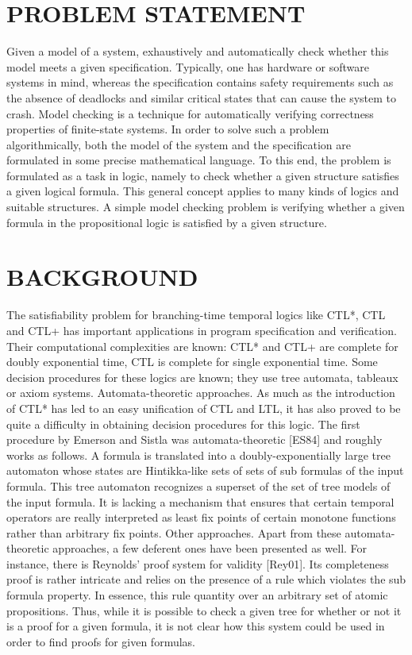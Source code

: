 \documentclass[12pt,letterpaper]{article}
\begin{document}
{\section{PROBLEM STATEMENT}
Given a model of a system, exhaustively and automatically check whether this model meets a given specification. Typically, one has hardware or software systems in mind, whereas the specification contains safety requirements such as the absence of deadlocks and similar critical states that can cause the system to crash. Model checking is a technique for automatically verifying correctness properties of finite-state systems.
In order to solve such a problem algorithmically, both the model of the system and the specification are formulated in some precise mathematical language. To this end, the problem is formulated as a task in logic, namely to check whether a given structure satisfies a given logical formula. This general concept applies to many kinds of logics and suitable structures. A simple model checking problem is verifying whether a given formula in the propositional logic is satisfied by a given structure.

\section{BACKGROUND}
The satisfiability problem for branching-time temporal logics like CTL*, CTL and CTL+ has important applications in program specification and verification. Their computational complexities are known: CTL* and CTL+ are complete for doubly exponential time, CTL is complete for single exponential time. Some decision procedures for these logics are known; they use tree automata, tableaux or axiom systems.
Automata-theoretic approaches. As much as the introduction of CTL* has led to an easy unification of CTL and LTL, it has also proved to be quite a difficulty in obtaining decision procedures for this logic. The first procedure by Emerson and Sistla was automata-theoretic [ES84] and roughly works as follows. A formula is translated into a doubly-exponentially large tree automaton whose states are Hintikka-like sets of sets of sub formulas of the input formula.
This tree automaton recognizes a superset of the set of tree models of the input formula. It
is lacking a mechanism that ensures that certain temporal operators are really interpreted
as least fix points of certain monotone functions rather than arbitrary fix points.
Other approaches. Apart from these automata-theoretic approaches, a few deferent ones
have been presented as well. For instance, there is Reynolds' proof system for validity
[Rey01]. Its completeness proof is rather intricate and relies on the presence of a rule which
violates the sub formula property. In essence, this rule quantity over an arbitrary set of
atomic propositions. Thus, while it is possible to check a given tree for whether or not it is
a proof for a given formula, it is not clear how this system could be used in order to
find proofs for given formulas.


}
\end{document}
